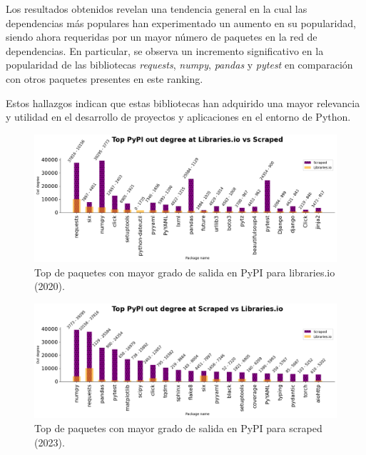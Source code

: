 Los resultados obtenidos revelan una tendencia general en la cual las dependencias más populares han
experimentado un aumento en su popularidad, siendo ahora requeridas por un mayor número de paquetes
en la red de dependencias. En particular, se observa un incremento significativo en la popularidad
de las bibliotecas \textit{requests}, \textit{numpy}, \textit{pandas} y \textit{pytest} en comparación
con otros paquetes presentes en este ranking.

Estos hallazgos indican que estas bibliotecas han adquirido una mayor relevancia y utilidad en el
desarrollo de proyectos y aplicaciones en el entorno de Python.

\begin{figure}[ht!]
    \begin{center}
        \includegraphics[width=1\textwidth]{img/pypi/libio_t20_outd_comparison.png}
        \caption{Top de paquetes con mayor grado de salida en PyPI para libraries.io (2020).}
        \label{fig:pypi_libio_outd_comparison}
    \end{center}
\end{figure}

\begin{figure}[ht!]
    \begin{center}
        \includegraphics[width=1\textwidth]{img/pypi/libio_scraped_t20_comparation.png}
        \caption{Top de paquetes con mayor grado de salida en PyPI para scraped (2023).}
        \label{fig:pypi_scraped_outd_comparison}
    \end{center}
\end{figure}

